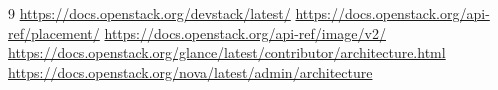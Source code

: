 \documentclass[10pt,a4paper]{article}
\begin{document}
\begin{thebibliography}{9}
\url{https://docs.openstack.org/devstack/latest/}
\url{https://docs.openstack.org/api-ref/placement/}
\url{https://docs.openstack.org/api-ref/image/v2/}
\url{https://docs.openstack.org/glance/latest/contributor/architecture.html}
\url{https://docs.openstack.org/nova/latest/admin/architecture}
\end{thebibliography}
\end{document}
